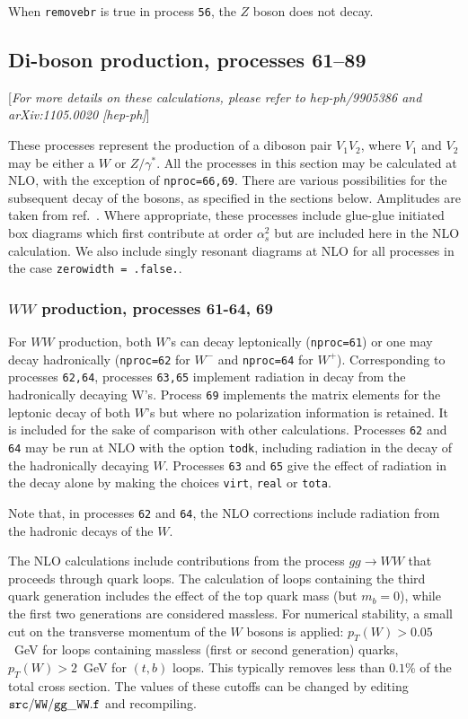 \documentclass[12pt]{article}
\begin{document}
When {\tt removebr} is true in process {\tt 56}, the $Z$ boson does not decay.

\subsection{Di-boson production, processes 61--89}
\label{subsec:diboson}

\begin{center}
[{\it For more details on these calculations, please refer to hep-ph/9905386
and arXiv:1105.0020 [hep-ph]}]
\end{center}

These processes represent the production of a diboson pair $V_1 V_2$,
where $V_1$ and $V_2$ may be either a $W$ or $Z/\gamma^*$. 
All the processes in this section may be calculated at NLO, with the exception
of {\tt nproc=66,69}. There are various
possibilities for the subsequent decay of the bosons, as specified in the
sections below. Amplitudes are taken from ref.~\cite{Dixon:1998py}.
Where appropriate, these processes include glue-glue initiated box diagrams
which first contribute at order $\alpha_s^2$ but are included here in the
NLO calculation. We also include singly resonant diagrams at NLO for all processes
in the case {\tt zerowidth = .false.}.

\subsubsection{$WW$ production, processes 61-64, 69}

For $WW$ production, both $W$'s can decay leptonically ({\tt nproc=61}) or one
may decay hadronically ({\tt nproc=62} for $W^-$ and {\tt nproc=64} for $W^+$).
Corresponding to processes {\tt 62,64}, processes {\tt 63,65} implement radiation in 
decay from the hadronically decaying W's.
Process {\tt 69} implements the matrix elements for the leptonic decay of
both $W$'s but where no polarization information is retained. It is included
for the sake of comparison with other calculations.
Processes {\tt 62} and {\tt 64} may be run at NLO with the option {\tt todk},
including radiation in the decay of the hadronically decaying $W$.
Processes {\tt 63} and {\tt 65} give the effect of radiation in the decay alone
by making the choices {\tt virt},  {\tt real} or {\tt tota}.

Note that, in processes
{\tt 62} and {\tt 64}, the NLO corrections include radiation from the
hadronic decays of the $W$.

The NLO calculations include contributions from the process $gg \to WW$
that proceeds through quark loops. The calculation of loops containing the third quark generation
includes the effect of the top quark mass (but $m_b=0$), while the first two
generations are considered massless. For numerical stability, a small cut on the
transverse momentum of the $W$ bosons is applied: $p_T(W)>0.05$~GeV for loops
containing massless (first or second generation) quarks, $p_T(W)>2$~GeV for $(t,b)$
loops. This typically removes less than $0.1$\% of the total cross section. The
values of these cutoffs can be changed by editing ${\tt src/WW/gg\_WW.f}$ and recompiling.
\end{document}
